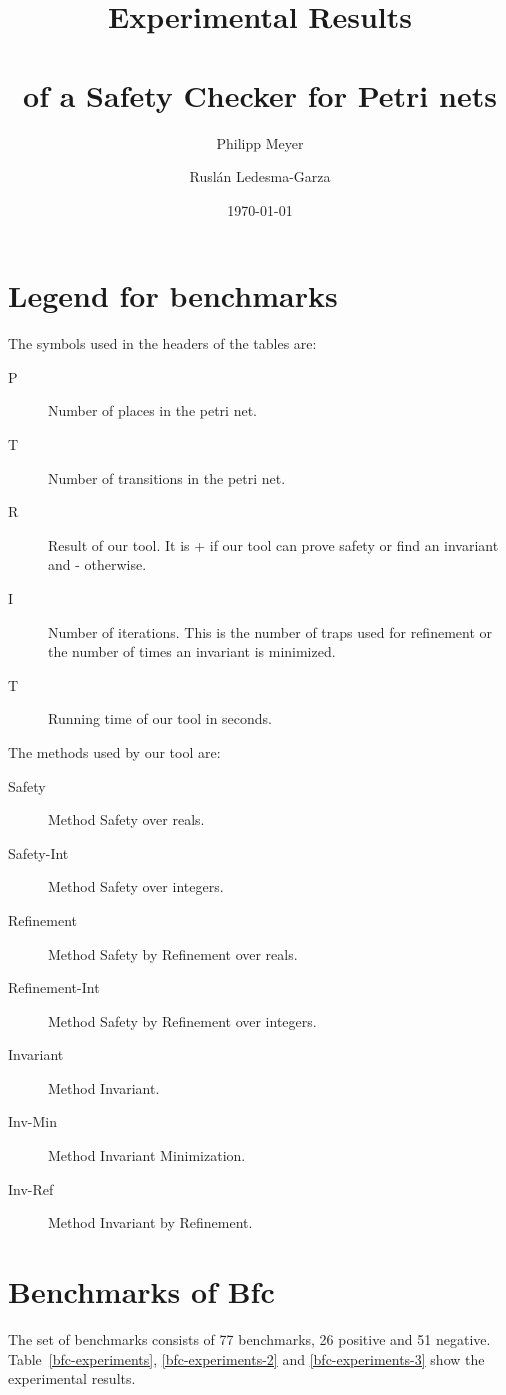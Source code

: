 \documentclass{article}
\newcommand{\bfc}{{\sc Bfc}}
\begin{document}
\title{Experimental Results \\ \mbox{ } \\ of a Safety Checker for Petri nets}
\author{Philipp Meyer \and Rusl\'{a}n Ledesma-Garza}
\date{\today}

\section{Legend for benchmarks}

The symbols used in the headers of the tables are:

\begin{description}
  \item[P] Number of places in the petri net.
  \item[T] Number of transitions in the petri net.
  \item[R] Result of our tool. It is + if our tool can prove safety or find an invariant and - otherwise.
  \item[I] Number of iterations. This is the number of traps used for refinement or the number of times an invariant is minimized.
  \item[T] Running time of our tool in seconds.
\end{description}

The methods used by our tool are:

\begin{description}
  \item[Safety] Method Safety over reals.
  \item[Safety-Int] Method Safety over integers.
  \item[Refinement] Method Safety by Refinement over reals.
  \item[Refinement-Int] Method Safety by Refinement over integers.
  \item[Invariant] Method Invariant.
  \item[Inv-Min] Method Invariant Minimization.
  \item[Inv-Ref] Method Invariant by Refinement.
\end{description}

\section{Benchmarks of \bfc}

The set of benchmarks consists of 77 benchmarks, 26 positive and 51 negative.
Table~\ref{bfc-experiments}, \ref{bfc-experiments-2} and \ref{bfc-experiments-3}
show the experimental results.
\end{document}
